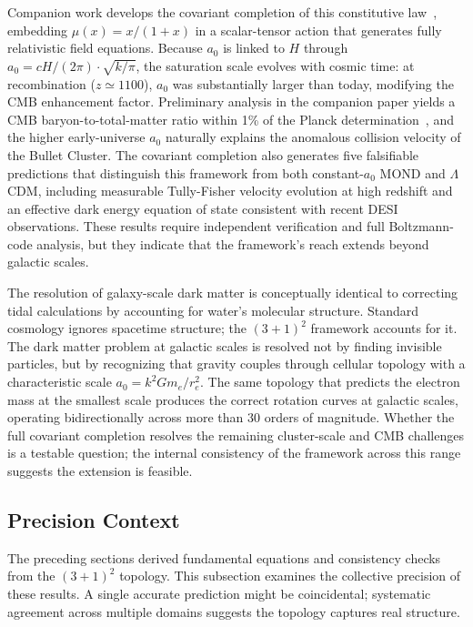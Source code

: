 \documentclass[aps,prd,preprint,superscriptaddress,showpacs,preprintnumbers,amsmath,amssymb,nofootinbib]{revtex4-2}
\begin{document}
Companion work develops the covariant completion of this constitutive law~\cite{paper2}, embedding $\mu(x) = x/(1+x)$ in a scalar-tensor action that generates fully relativistic field equations. Because $a_0$ is linked to $H$ through $a_0 = cH/(2\pi) \cdot \sqrt{k/\pi}$, the saturation scale evolves with cosmic time: at recombination ($z \simeq 1100$), $a_0$ was substantially larger than today, modifying the CMB enhancement factor. Preliminary analysis in the companion paper yields a CMB baryon-to-total-matter ratio within 1\% of the Planck determination~\cite{paper2}, and the higher early-universe $a_0$ naturally explains the anomalous collision velocity of the Bullet Cluster. The covariant completion also generates five falsifiable predictions that distinguish this framework from both constant-$a_0$ MOND and $\Lambda$CDM, including measurable Tully-Fisher velocity evolution at high redshift and an effective dark energy equation of state consistent with recent DESI observations. These results require independent verification and full Boltzmann-code analysis, but they indicate that the framework's reach extends beyond galactic scales.

The resolution of galaxy-scale dark matter is conceptually identical to correcting tidal calculations by accounting for water's molecular structure. Standard cosmology ignores spacetime structure; the $(3+1)^2$ framework accounts for it. The dark matter problem at galactic scales is resolved not by finding invisible particles, but by recognizing that gravity couples through cellular topology with a characteristic scale $a_0 = k^2 G m_e / r_e^2$. The same topology that predicts the electron mass at the smallest scale produces the correct rotation curves at galactic scales, operating bidirectionally across more than 30 orders of magnitude. Whether the full covariant completion resolves the remaining cluster-scale and CMB challenges is a testable question; the internal consistency of the framework across this range suggests the extension is feasible.

\subsection{Precision Context}
\label{subsec:precision}

The preceding sections derived fundamental equations and consistency checks from the $(3+1)^2$ topology. This subsection examines the collective precision of these results. A single accurate prediction might be coincidental; systematic agreement across multiple domains suggests the topology captures real structure.
\end{document}

